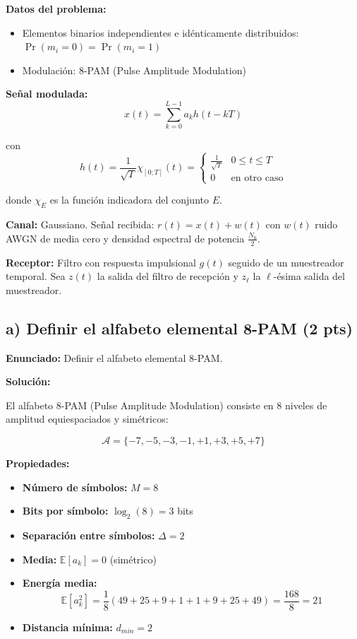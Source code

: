 \documentclass[11pt,a4paper]{article}
\begin{document}
\textbf{Datos del problema:}
\begin{itemize}
    \item Elementos binarios independientes e id\'enticamente distribuidos: $\Pr(m_i = 0) = \Pr(m_i = 1)$
    \item Modulaci\'on: 8-PAM (Pulse Amplitude Modulation)
\end{itemize}

\textbf{Se\~nal modulada:}
\[
x(t) = \sum_{k=0}^{L-1} a_k h(t-kT)
\]

con
\[
h(t) = \frac{1}{\sqrt{T}} \chi_{[0;T]}(t) = \begin{cases}
\frac{1}{\sqrt{T}} & 0 \leq t \leq T \\
0 & \text{en otro caso}
\end{cases}
\]

donde $\chi_E$ es la funci\'on indicadora del conjunto $E$.

\textbf{Canal:} Gaussiano. Se\~nal recibida: $r(t) = x(t) + w(t)$ con $w(t)$ ruido AWGN de media cero y densidad espectral de potencia $\frac{N_0}{2}$.

\textbf{Receptor:} Filtro con respuesta impulsional $g(t)$ seguido de un muestreador temporal. Sea $z(t)$ la salida del filtro de recepci\'on y $z_\ell$ la $\ell$-\'esima salida del muestreador.

\subsection*{a) Definir el alfabeto elemental 8-PAM (2 pts)}

\textbf{Enunciado:} Definir el alfabeto elemental 8-PAM.

\vspace{0.3cm}
\textbf{Soluci\'on:}

El alfabeto 8-PAM (Pulse Amplitude Modulation) consiste en 8 niveles de amplitud equiespaciados y sim\'etricos:

\[
\boxed{\mathcal{A} = \{-7, -5, -3, -1, +1, +3, +5, +7\}}
\]

\textbf{Propiedades:}
\begin{itemize}
    \item \textbf{N\'umero de s\'imbolos:} $M = 8$
    \item \textbf{Bits por s\'imbolo:} $\log_2(8) = 3$ bits
    \item \textbf{Separaci\'on entre s\'imbolos:} $\Delta = 2$
    \item \textbf{Media:} $\mathbb{E}[a_k] = 0$ (sim\'etrico)
    \item \textbf{Energ\'ia media:}
    \[
    \mathbb{E}[a_k^2] = \frac{1}{8}(49 + 25 + 9 + 1 + 1 + 9 + 25 + 49) = \frac{168}{8} = 21
    \]
    \item \textbf{Distancia m\'inima:} $d_{min} = 2$
\end{itemize}
\end{document}
